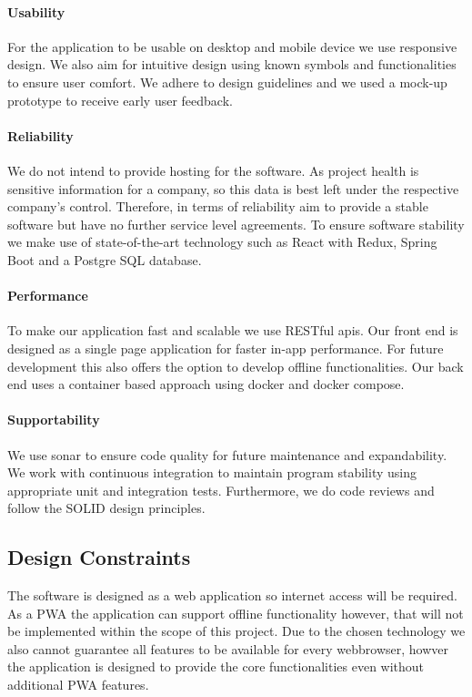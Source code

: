 \paragraph*{Usability}
\label{sec:domainBca}
For the application to be usable on desktop and mobile device we use responsive design. We also aim for intuitive design using known symbols and functionalities to ensure user comfort. We adhere to design guidelines and we used a mock-up prototype to receive early user feedback.
\paragraph*{Reliability}
\label{sec:domainBcb}
We do not intend to provide hosting for the software. As project health is sensitive information for a company, so this data is best left under the respective company's control. Therefore, in terms of reliability aim to provide a stable software but have no further service level agreements. To ensure software stability we make use of state-of-the-art technology such as React with Redux, Spring Boot and a Postgre \acs{SQL} database.
\paragraph*{Performance}
\label{sec:domainBcc}
To make our application fast and scalable we use RESTful apis. Our front end is designed as a single page application for faster in-app performance. For future development this also offers the option to develop offline functionalities. Our back end uses a container based approach using docker and docker compose.
\paragraph*{Supportability}
\label{sec:domainBcd}
We use sonar to ensure code quality for future maintenance and expandability. We work with continuous integration to maintain program stability using appropriate unit and integration tests. Furthermore, we do code reviews and follow the SOLID design principles.  

\subsection{Design Constraints}
\label{sec:domainBd}
The software is designed as a web application so internet access will be required. As a  \acs{PWA} the application can support offline functionality however, that will not be implemented within the scope of this project. Due to the chosen technology we also cannot guarantee all features to be available for every webbrowser, howver the application is designed to provide the core functionalities even without additional  \acs{PWA} features.

